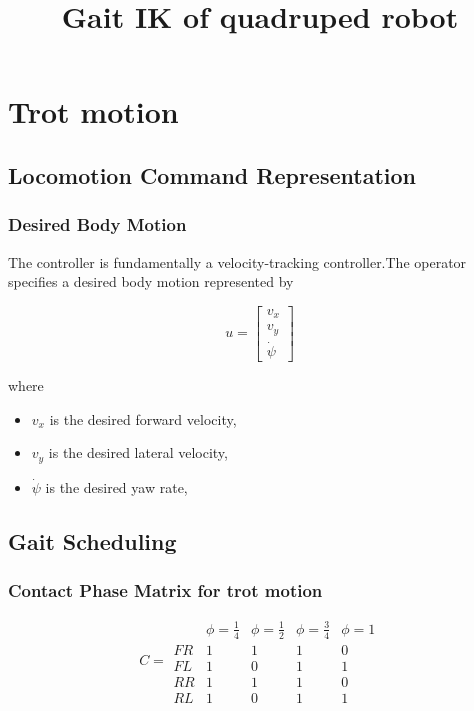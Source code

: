 \documentclass[11pt,a4paper]{report}
\title{Gait IK of quadruped robot}
\date{}
\begin{document}
\setcounter{tocdepth}{1}
\maketitle
\tableofcontents
\chapter{Trot motion}
\section{Locomotion Command Representation}

\subsection{Desired Body Motion}

The  controller is fundamentally a velocity-tracking
controller.The operator specifies a desired body motion represented by

\[
u=
\begin{bmatrix}
v_x\\
v_y\\
\dot{\psi}
\end{bmatrix}
\]

where

\begin{itemize}
\item $v_x$ is the desired forward velocity,
\item $v_y$ is the desired lateral velocity,
\item $\dot{\psi}$ is the desired yaw rate,
\end{itemize}


\section{Gait Scheduling}
\subsection{Contact Phase Matrix for trot motion }

\[
C=
\begin{array}{c|cccc}
&
\phi=\frac14 &
\phi=\frac12 &
\phi=\frac34 &
\phi=1
\\ \hline
FR & 1 & 1 & 1 & 0\\
FL & 1 & 0 & 1 & 1\\
RR & 1 & 1 & 1 & 0\\
RL & 1 & 0 & 1 & 1
\end{array}
\]
\end{document}
